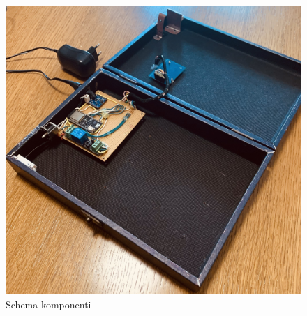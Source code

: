 \begin{figure}[h!]
    \centering
    \includegraphics[width=\textwidth]{images/integrated-components}
    \caption{Schema komponenti}
\end{figure}
